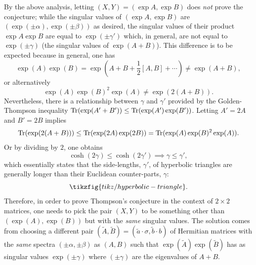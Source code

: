 \documentclass[notitlepage, 10pt]{article}
\begin{document}
By the above analysis, letting $(X,Y) = (\exp A, \exp B)$ does \textit{not} prove the conjecture;
while the singular values of $(\exp A, \exp B)$ are $(\exp (\pm \alpha), \exp(\pm \beta))$ as desired, the singular values of their product $\exp A \exp B$ are equal to $\exp(\pm \gamma')$ which, in general, are not equal to $\exp(\pm \gamma)$ (the singular values of $\exp (A + B)$).
This difference is to be expected because in general, one has
\begin{equation}
    \exp(A)\exp(B) = \exp(A+B+\frac{1}{2}[A,B]+\cdots) \neq \exp(A+B),
\end{equation}
or alternatively
\begin{equation}
    \exp(A)\exp(B)^2\exp(A) \neq \exp(2(A+B)).
\end{equation}
Nevertheless, there is a relationship between $\gamma$ and $\gamma'$ provided by the Golden-Thompson inequality $\operatorname{Tr}(\exp(A'+B')) \leq \operatorname{Tr}(\exp(A')\exp(B'))$.
Letting $A'=2A$ and $B'=2B$ implies
\begin{equation}
    \operatorname{Tr}(\exp(2(A+B))) \leq \operatorname{Tr}(\exp(2A)\exp(2B)) = \operatorname{Tr}(\exp(A)\exp(B)^2\exp(A)).
\end{equation}
Or by dividing by $2$, one obtains
\begin{equation}
    \cosh(2\gamma) \leq \cosh(2 \gamma') \implies \gamma \leq \gamma',
\end{equation}
which essentially states that the side-lengths, $\gamma'$, of hyperbolic triangles are generally longer than their Euclidean counter-parts, $\gamma$:
\begin{equation}
    \tikzfig{tikz/hyperbolic-triangle}.
\end{equation}
Therefore, in order to prove Thompson's conjecture in the context of $2\times 2$ matrices, one needs to pick the pair $(X,Y)$ to be something other than $(\exp(A), \exp(B))$ but with the \textit{same} singular values.
The solution comes from choosing a different pair $(\tilde A, \tilde B) = (\tilde a \cdot \sigma, \tilde b \cdot b)$ of Hermitian matrices with the \textit{same} spectra $(\pm \alpha, \pm \beta)$ as $(A,B)$ such that $\exp(\tilde A)\exp(\tilde B)$ has as singular values $\exp(\pm \gamma)$ where $(\pm \gamma)$ are the eigenvalues of $A+B$.
\end{document}
